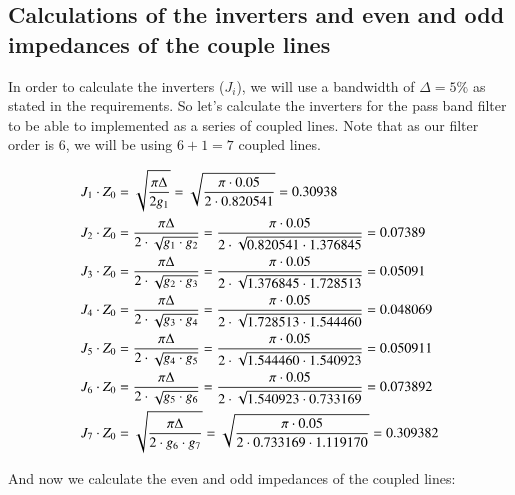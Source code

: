 \documentclass[12pt]{report} %
\begin{document}
\subsection{Calculations of the inverters and even and odd impedances of the couple lines}

In order to calculate the inverters ($J_i$), we will use a bandwidth of $\Delta = 5\%$ as stated in the requirements. So let's calculate the inverters for the pass band filter to be able to implemented as a series of coupled lines. Note that as our filter order is 6, we will be using $6 + 1 = 7$ coupled lines.

\begin{align*}
J_1 \cdot Z_0 &= \sqrt{\frac{\pi \* \Delta}{2 \* g_1}} = \sqrt{\frac{\pi \cdot 0.05}{2 \cdot 0.820541}} = 0.30938 \\
J_2 \cdot Z_0 &= \frac{\pi \* \Delta}{2 \cdot \sqrt{g_1 \cdot g_2}} = \frac{\pi \cdot 0.05}{2 \cdot \sqrt{0.820541 \cdot 1.376845}} = 0.07389 \\
J_3 \cdot Z_0 &= \frac{\pi \* \Delta}{2 \cdot \sqrt{g_2 \cdot g_3}} = \frac{\pi \cdot 0.05}{2 \cdot \sqrt{1.376845 \cdot 1.728513}} = 0.05091 \\
J_4 \cdot Z_0 &= \frac{\pi \* \Delta}{2 \cdot \sqrt{g_3 \cdot g_4}} = \frac{\pi \cdot 0.05}{2 \cdot \sqrt{1.728513 \cdot 1.544460}} = 0.048069 \\
J_5 \cdot Z_0 &= \frac{\pi \* \Delta}{2 \cdot \sqrt{g_4 \cdot g_5}} = \frac{\pi \cdot 0.05}{2 \cdot \sqrt{1.544460 \cdot 1.540923}} = 0.050911 \\
J_6 \cdot Z_0 &= \frac{\pi \* \Delta}{2 \cdot \sqrt{g_5 \cdot g_6}} = \frac{\pi \cdot 0.05}{2 \cdot \sqrt{1.540923 \cdot 0.733169}} = 0.073892 \\
J_7 \cdot Z_0 &= \sqrt{\frac{\pi \* \Delta}{2 \cdot g_6 \cdot g_7}} = \sqrt{\frac{\pi \cdot 0.05}{2 \cdot 0.733169 \cdot 1.119170}} = 0.309382 \\
\end{align*}

And now we calculate the even and odd impedances of the coupled lines:
\end{document}
